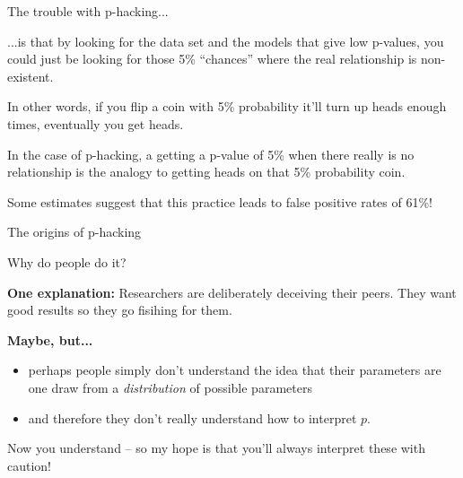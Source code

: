 \documentclass[aspectratio=169]{beamer}
\begin{document}
\begin{frame}{The trouble with p-hacking...}

...is that by looking for the data set and the models that give low p-values, you could just be looking for those 5\% ``chances'' where the real relationship is non-existent.

\vspace{5mm}

In other words, if you flip a coin with 5\% probability it'll turn up heads enough times, eventually you get heads.

\vspace{5mm}

In the case of p-hacking, a getting a p-value of 5\% when there really is no relationship is the analogy to getting heads on that 5\% probability coin.
\vspace{5mm}
\pause

Some estimates suggest that this practice leads to false positive rates of 61\%!

\end{frame}


\begin{frame}{The origins of p-hacking}

Why do people do it?

\pause 

\vspace{5mm}
\textbf{One explanation:}  Researchers are deliberately deceiving their peers.  They want good results so they go fisihing for them.

\pause
\vspace{5mm}

\textbf{Maybe, but...} 
\begin{itemize}
  \item perhaps people simply don't understand the idea that their parameters are one draw from a \textit{distribution} of possible parameters
  \item and therefore they don't really understand how to interpret $p$.
\end{itemize}

\vspace{5mm}

Now you understand -- so my hope is that you'll always interpret these with caution!
\end{frame}
\end{document}
